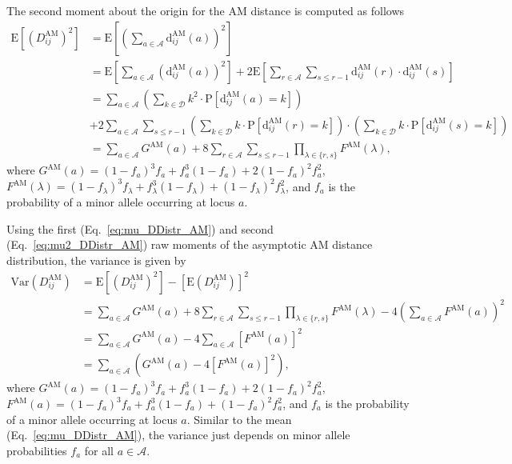 \documentclass[10pt,letterpaper]{article}
\begin{document}
The second moment about the origin for the AM distance is computed as follows
%
\begin{equation}\label{eq:mu2_DDistr_AM}
\begin{aligned}
\text{E}\left[\left(D^\text{AM}_{ij}\right)^2\right] &= \text{E}\left[\left(\sum_{a \in \mathcal{A}} \text{d}^\text{AM}_{ij}(a)\right)^2\right] \\
&= \text{E}\left[\sum_{a \in \mathcal{A}} \left(\text{d}^\text{AM}_{ij}(a)\right)^2\right] + 2 \text{E}\left[\sum_{r \in \mathcal{A}} \sum_{s \leq r - 1} \text{d}^\text{AM}_{ij}(r) \cdot \text{d}^\text{AM}_{ij}(s)\right] \\
&= \sum_{a \in \mathcal{A}} \left(\sum_{k \in \mathcal{D}} k^2 \cdot \text{P}\left[\text{d}^\text{AM}_{ij}(a) = k\right]\right) \\
&+ 2\sum_{a \in \mathcal{A}} \sum_{s \leq r - 1} \left(\sum_{k \in \mathcal{D}} k \cdot \text{P}\left[\text{d}^\text{AM}_{ij}(r) = k\right]\right) \cdot \left(\sum_{k \in \mathcal{D}} k \cdot \text{P}\left[\text{d}^\text{AM}_{ij}(s) = k\right]\right) \\
&= \sum_{a \in \mathcal{A}} G^\text{AM}(a) + 8 \sum_{r \in \mathcal{A}} \sum_{s \leq r - 1} \prod_{\lambda \in \{r,s\}} F^\text{AM}(\lambda),
\end{aligned}
\end{equation}
%
where $G^\text{AM}(a) = (1 - f_a)^3 f_a + f^3_a (1 - f_a) + 2 (1 - f_a)^2 f^2_a$, $F^\text{AM}(\lambda) = (1 - f_\lambda)^3 f_\lambda + f^3_\lambda (1 - f_\lambda) + (1 - f_\lambda)^2 f^2_\lambda$, and $f_a$ is the probability of a minor allele occurring at locus $a$.

Using the first (Eq.~\ref{eq:mu_DDistr_AM}) and second (Eq.~\ref{eq:mu2_DDistr_AM}) raw moments of the asymptotic AM distance distribution, the variance is given by
%
\begin{equation}\label{eq:var_DDistr_AM}
\begin{aligned}
\text{Var}\left(D^\text{AM}_{ij}\right) &= \text{E}\left[\left(D^\text{AM}_{ij}\right)^2\right] - \left[\text{E}\left(D^\text{AM}_{ij}\right)\right]^2 \\
&= \sum_{a \in \mathcal{A}} G^\text{AM}(a) + 8\sum_{r \in \mathcal{A}} \sum_{s \leq r - 1} \prod_{\lambda \in \{r,s\}} F^\text{AM}(\lambda) - 4\left(\sum_{a \in \mathcal{A}}F^\text{AM}(a)\right)^2 \\
&= \sum_{a \in \mathcal{A}} G^\text{AM}(a) - 4\sum_{a \in \mathcal{A}}\left[F^\text{AM}(a)\right]^2 \\
&= \sum_{a \in \mathcal{A}} \left(G^\text{AM}(a)- 4\left[F^\text{AM}(a)\right]^2\right),
\end{aligned}
\end{equation}
%
where $G^\text{AM}(a) = (1 - f_a)^3 f_a + f^3_a (1 - f_a) + 2 (1 - f_a)^2 f^2_a$, $F^\text{AM}(a) = (1 - f_a)^3 f_a + f^3_a (1 - f_a) + (1 - f_a)^2 f^2_a$, and $f_a$ is the probability of a minor allele occurring at locus $a$. Similar to the mean (Eq.~\ref{eq:mu_DDistr_AM}), the variance just depends on minor allele probabilities $f_a$ for all $a \in \mathcal{A}$.
\end{document}
